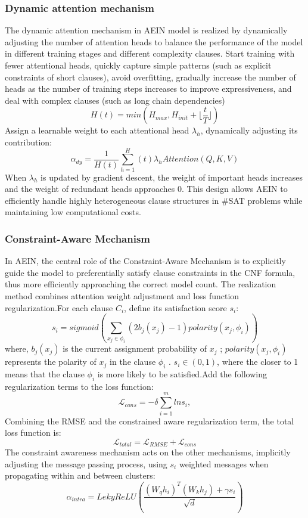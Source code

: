 \subsubsection{Dynamic attention mechanism}
The dynamic attention mechanism in AEIN model is realized by dynamically adjusting the number of attention heads to balance the performance of the model in different training stages and different complexity clauses. Start training with fewer attentional heads, quickly capture simple patterns (such as explicit constraints of short clauses), avoid overfitting, gradually increase the number of heads as the number of training steps increases to improve expressiveness, and deal with complex clauses (such as long chain dependencies) 
\begin{equation}
H(t)=min(H_{max},H_{init}+\lfloor\frac{t}{T}\rfloor)
\end{equation}
Assign a learnable weight to each attentional head \(\lambda_h\), dynamically adjusting its contribution:
\begin{equation}
\alpha_{dy}=\frac{1}{H(t)}\sum_{h=1}^H(t) \lambda_h Attention(Q,K,V)
\end{equation}
When \(\lambda_h\) is updated by gradient descent, the weight of important heads increases and the weight of redundant heads approaches 0.
This design allows AEIN to efficiently handle highly heterogeneous clause structures in \#SAT problems while maintaining low computational costs.
\subsubsection{Constraint-Aware Mechanism}
In AEIN, the central role of the Constraint-Aware Mechanism is to explicitly guide the model to preferentially satisfy clause constraints in the CNF formula, thus more efficiently approaching the correct model count. The realization method combines attention weight adjustment and loss function regularization.For each clause \(C_i\), define its satisfaction score \(s_i\):
\begin{equation}
s_i=sigmoid(\sum_{x_j\in \phi_i}(2b_j(x_j)-1)polarity(x_j,\phi_i))
\end{equation}
where, \(b_j(x_j)\) is  the current assignment probability of \(x_j\) ;  \(polarity(x_j,\phi_i)\) represents the polarity of \(x_j\) in the clause \(\phi_i\) .
\(s_i\in (0,1)\), where the closer to 1 means that the clause \(\phi_i\) is more likely to be satisfied.Add the following regularization terms to the loss function:
\begin{equation}
\mathcal L_{cons}=-\delta  \sum_{i=1}^mlns_i,
\end{equation}
Combining the RMSE and the constrained aware regularization term, the total loss function is:
\begin{equation}
\mathcal L_{total}=\mathcal L_{RMSE}+\mathcal L_{cons}
\end{equation}
The constraint awareness mechanism acts on the other mechanisms, implicitly adjusting the message passing process, using \(s_i\) weighted messages when propagating within and between clusters:
\begin{equation}
\alpha_{intra}=LekyReLU(\frac{(W_qh_i)^T(W_kh_j)+\gamma s_i}{\sqrt{d}})
\end{equation}
